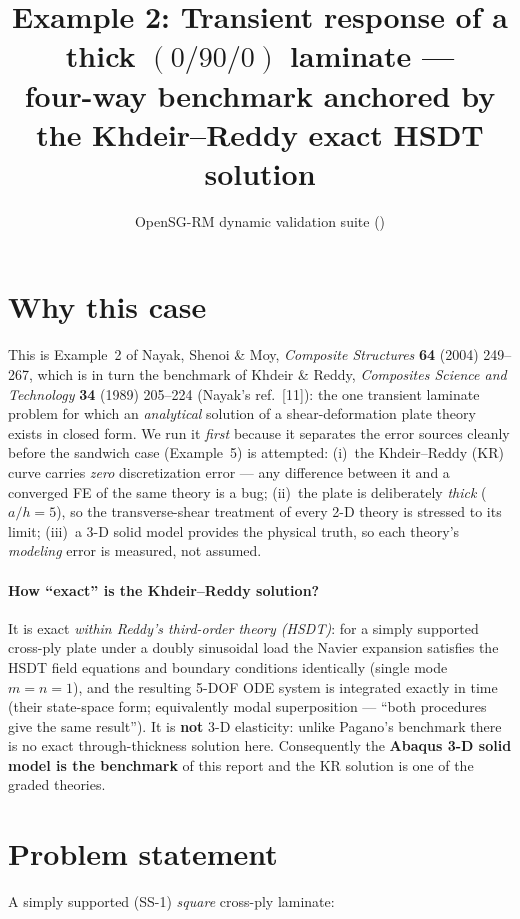 \documentclass[11pt]{article}
\title{Example 2: Transient response of a thick $(0/90/0)$ laminate ---\\
four-way benchmark anchored by the Khdeir--Reddy exact HSDT solution}
\author{OpenSG-RM dynamic validation suite (\code{examples/opensg-rm\_dynamic/ex2})}
\date{}
\begin{document}
\maketitle

\section{Why this case}
This is Example~2 of Nayak, Shenoi \& Moy, \emph{Composite Structures}
\textbf{64} (2004) 249--267, which is in turn the benchmark of Khdeir \&
Reddy, \emph{Composites Science and Technology} \textbf{34} (1989) 205--224
(Nayak's ref.~[11]): the one transient laminate problem for which an
\emph{analytical} solution of a shear-deformation plate theory exists in
closed form.  We run it \emph{first} because it separates the error sources
cleanly before the sandwich case (Example~5) is attempted:
(i)~the Khdeir--Reddy (KR) curve carries \emph{zero} discretization error
--- any difference between it and a converged FE of the same theory is a
bug; (ii)~the plate is deliberately \emph{thick} ($a/h=5$), so the
transverse-shear treatment of every 2-D theory is stressed to its limit;
(iii)~a 3-D solid model provides the physical truth, so each theory's
\emph{modeling} error is measured, not assumed.

\paragraph{How ``exact'' is the Khdeir--Reddy solution?}
It is exact \emph{within Reddy's third-order theory (HSDT)}: for a simply
supported cross-ply plate under a doubly sinusoidal load the Navier
expansion satisfies the HSDT field equations and boundary conditions
identically (single mode $m=n=1$), and the resulting 5-DOF ODE system is
integrated exactly in time (their state-space form; equivalently modal
superposition --- ``both procedures give the same result'').  It is
\textbf{not} 3-D elasticity: unlike Pagano's benchmark there is no exact
through-thickness solution here.  Consequently the \textbf{Abaqus 3-D
solid model is the benchmark} of this report and the KR solution is one of
the graded theories.

\section{Problem statement}
A simply supported (SS-1) \emph{square} cross-ply laminate:
\end{document}
